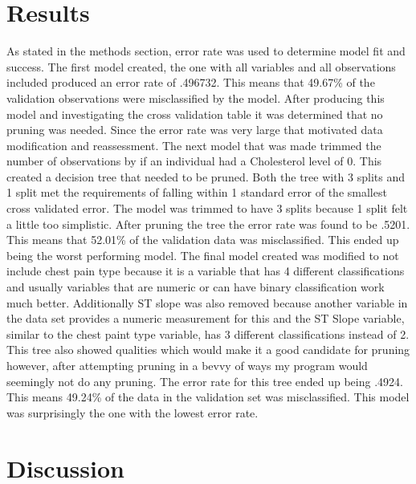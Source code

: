 \documentclass[12pt]{article}
\begin{document}
\section{Results}
\label{sec:resu}
As stated in the methods section, error rate was used to determine model fit and success.
The first model created, the one with all variables and all observations included produced an  error rate of .496732. This means that 49.67\% of the validation observations were misclassified by the model. After producing this model and investigating the cross validation table it was determined that no pruning was needed. Since the error rate was very large that motivated data modification and reassessment.
The next model that was made trimmed the number of observations by if an individual had a Cholesterol level of 0. This created a decision tree that needed to be pruned. Both the tree with 3 splits and 1 split met the requirements of falling within 1 standard error of the smallest cross validated error. The model was trimmed to have 3 splits because 1 split felt a little too simplistic. After pruning the tree the error rate was found to be .5201. This means that 52.01\% of the validation data was misclassified. This ended up being the worst performing model.
The final model created was modified to not include chest pain type because it is a variable that has 4 different classifications and usually variables that are numeric or can have binary classification work much better. Additionally ST slope was also removed because another variable in the data set provides a numeric measurement for this and the ST Slope variable, similar to the chest paint type variable, has 3 different classifications instead of 2. This tree also showed qualities which would make it a good candidate for pruning however, after attempting pruning in a bevvy of ways my program would seemingly not do any pruning. The error rate for this tree ended up being .4924. This means 49.24\% of the data in the validation set was misclassified. This model was surprisingly the one with the lowest error rate.

\section{Discussion}
\label{sec:disc}
\end{document}
